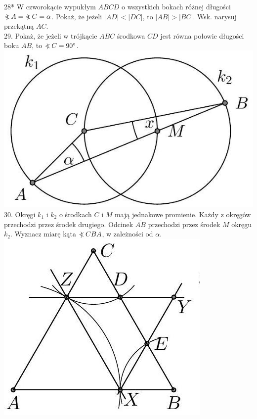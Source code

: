 \documentclass[10pt]{article}
\newcommand\Varangle{\mathop{{<\!\!\!\!\!\text{\small)}}\:}\nolimits}
\begin{document}
28* W czworokącie wypukłym \(A B C D\) o wszystkich bokach różnej długości \(\Varangle A=\Varangle C=\alpha\). Pokaż, że jeżeli \(|A D|<|D C|\), to \(|A B|>|B C|\). Wsk. narysuj przekątną \(A C\).\\
29. Pokaż, że jeżeli w trójkącie \(A B C\) środkowa \(C D\) jest równa połowie długości boku \(A B\), to \(\Varangle C=90^{\circ}\).\\
\includegraphics[max width=\textwidth, center]{2024_11_21_71f62bd117d375398909g-174(1)}\\
30. Okręgi \(k_{1}\) i \(k_{2}\) o środkach \(C\) i \(M\) mają jednakowe promienie. Każdy z okręgów przechodzi przez środek drugiego. Odcinek \(\overline{A B}\) przechodzi przez środek \(M\) okręgu \(k_{2}\). Wyznacz miarę kąta \(\Varangle C B A\), w zależności od \(\alpha\).\\
\includegraphics[max width=\textwidth, center]{2024_11_21_71f62bd117d375398909g-174}\\
\end{document}

